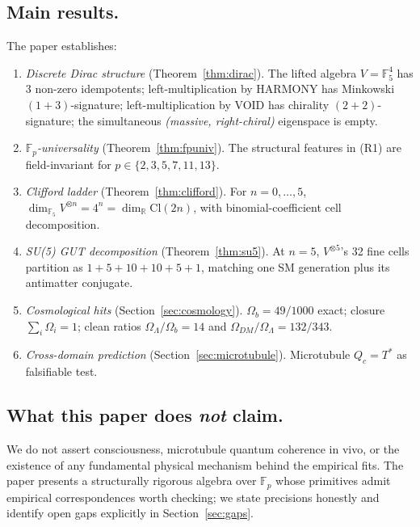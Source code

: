 \documentclass[11pt]{amsart}
\theoremstyle{plain}
\theoremstyle{definition}
\theoremstyle{remark}
\newcommand{\F}{\mathbb{F}}
\newcommand{\R}{\mathbb{R}}
\newcommand{\Cl}{\mathrm{Cl}}
\newcommand{\Tstar}{T^{*}}
\begin{document}
\subsection{Main results.} The paper establishes:
\begin{enumerate}[label={(R\arabic*)}]
\item \emph{Discrete Dirac structure} (Theorem~\ref{thm:dirac}). The lifted
algebra $V = \F_5^4$ has 3 non-zero idempotents; left-multiplication by
HARMONY has Minkowski $(1{+}3)$-signature; left-multiplication by VOID has
chirality $(2{+}2)$-signature; the simultaneous \textit{(massive,
right-chiral)} eigenspace is empty.

\item \emph{$\F_p$-universality} (Theorem~\ref{thm:fpuniv}). The structural
features in (R1) are field-invariant for $p \in \{2,3,5,7,11,13\}$.

\item \emph{Clifford ladder} (Theorem~\ref{thm:clifford}). For $n=0,\ldots,5$,
$\dim_{\F_5}V^{\otimes n} = 4^n = \dim_\R \Cl(2n)$, with binomial-coefficient
cell decomposition.

\item \emph{SU(5) GUT decomposition} (Theorem~\ref{thm:su5}). At $n=5$,
$V^{\otimes 5}$'s 32 fine cells partition as $1+5+10+10+5+1$, matching one
SM generation plus its antimatter conjugate.

\item \emph{Cosmological hits} (Section~\ref{sec:cosmology}). $\Omega_b = 49/1000$
exact; closure $\sum_i \Omega_i = 1$; clean ratios $\Omega_\Lambda/\Omega_b = 14$
and $\Omega_{DM}/\Omega_\Lambda = 132/343$.

\item \emph{Cross-domain prediction} (Section~\ref{sec:microtubule}).
Microtubule $Q_c = \Tstar$ as falsifiable test.
\end{enumerate}

\subsection{What this paper does \emph{not} claim.} We do not assert
consciousness, microtubule quantum coherence in vivo, or the existence of
any fundamental physical mechanism behind the empirical fits. The paper
presents a structurally rigorous algebra over $\F_p$ whose primitives
admit empirical correspondences worth checking; we state precisions
honestly and identify open gaps explicitly in Section~\ref{sec:gaps}.
\end{document}
